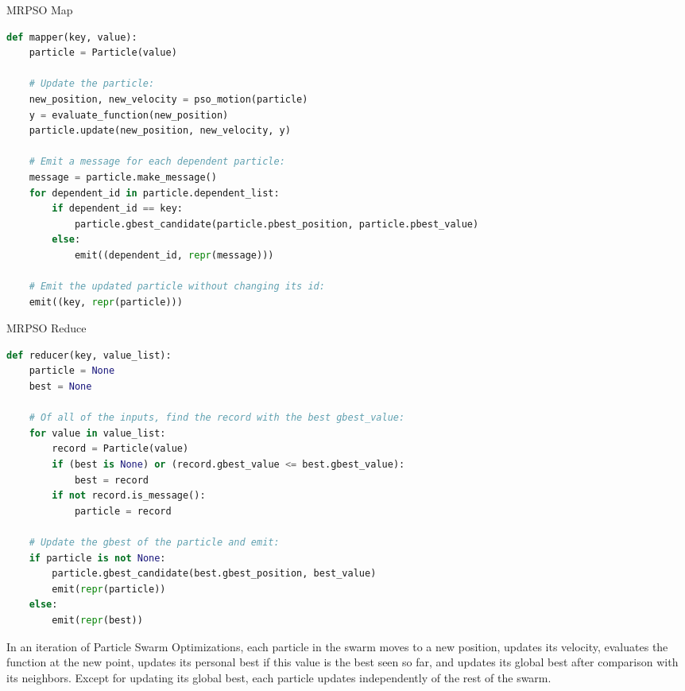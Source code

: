 \documentclass[letterpaper]{sig-alternate}
\begin{document}
\begin{algorithm*}[tbp]
\caption{MRPSO Map}
\label{alg:pso-map}
\begin{lstlisting}[language=Python]
def mapper(key, value):
    particle = Particle(value)

    # Update the particle:
    new_position, new_velocity = pso_motion(particle)
    y = evaluate_function(new_position)
    particle.update(new_position, new_velocity, y)

    # Emit a message for each dependent particle:
    message = particle.make_message()
    for dependent_id in particle.dependent_list:
        if dependent_id == key:
            particle.gbest_candidate(particle.pbest_position, particle.pbest_value)
        else:
            emit((dependent_id, repr(message)))

    # Emit the updated particle without changing its id:
    emit((key, repr(particle)))
\end{lstlisting}
\end{algorithm*}

\begin{algorithm*}[tbp]
\caption{MRPSO Reduce}
\label{alg:pso-reduce}
\begin{lstlisting}[language=Python]
def reducer(key, value_list):
    particle = None
    best = None

    # Of all of the inputs, find the record with the best gbest_value:
    for value in value_list:
        record = Particle(value)
        if (best is None) or (record.gbest_value <= best.gbest_value):
            best = record
        if not record.is_message():
            particle = record

    # Update the gbest of the particle and emit:
    if particle is not None:
        particle.gbest_candidate(best.gbest_position, best_value)
        emit(repr(particle))
    else:
        emit(repr(best))
\end{lstlisting}
\end{algorithm*}


In an iteration of Particle Swarm Optimizations, each particle in the swarm
moves to a new position, updates its velocity, evaluates the function at the
new point, updates its personal best if this value is the best seen so far,
and updates its global best after comparison with its neighbors.  Except for
updating its global best, each particle updates independently of the rest of
the swarm.
\end{document}

